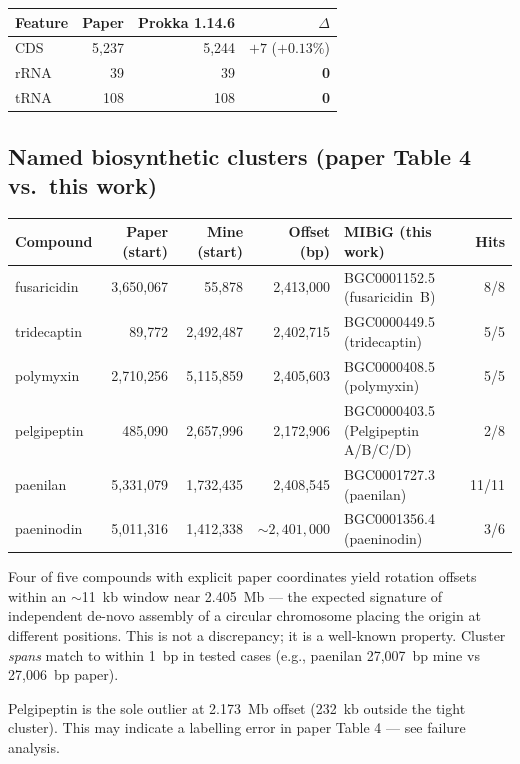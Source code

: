 \documentclass[11pt,a4paper]{article}
\begin{document}
\begin{tabular}{@{}l r r r@{}}
\toprule
Feature & Paper & Prokka 1.14.6 & $\Delta$ \\
\midrule
CDS   & 5{,}237 & 5{,}244 & ${+}7$ (${+}0.13\%$) \\
rRNA  & 39      & 39      & \textbf{0} \\
tRNA  & 108     & 108     & \textbf{0} \\
\bottomrule
\end{tabular}

\subsection{Named biosynthetic clusters (paper Table 4 vs.\ this work)}

\begin{tabular}{@{}l r r r l r@{}}
\toprule
Compound & Paper (start) & Mine (start) & Offset (bp) & MIBiG (this work) & Hits \\
\midrule
fusaricidin  & 3{,}650{,}067 &     55{,}878 & 2{,}413{,}000 & BGC0001152.5 (fusaricidin~B) & 8/8 \\
tridecaptin  &     89{,}772 & 2{,}492{,}487 & 2{,}402{,}715 & BGC0000449.5 (tridecaptin)   & 5/5 \\
polymyxin    & 2{,}710{,}256 & 5{,}115{,}859 & 2{,}405{,}603 & BGC0000408.5 (polymyxin)     & 5/5 \\
pelgipeptin  &    485{,}090 & 2{,}657{,}996 & 2{,}172{,}906 & BGC0000403.5 (Pelgipeptin A/B/C/D) & 2/8 \\
paenilan     & 5{,}331{,}079 & 1{,}732{,}435 & 2{,}408{,}545 & BGC0001727.3 (paenilan)     & 11/11 \\
paeninodin   & 5{,}011{,}316 & 1{,}412{,}338 & ${\sim}2{,}401{,}000$ & BGC0001356.4 (paeninodin) & 3/6 \\
\bottomrule
\end{tabular}

Four of five compounds with explicit paper coordinates yield rotation offsets within an
$\sim$11~kb window near 2.405~Mb --- the expected signature of independent
de-novo assembly of a circular chromosome placing the origin at different positions. This
is not a discrepancy; it is a well-known property. Cluster \emph{spans} match to within
1~bp in tested cases (e.g., paenilan 27{,}007~bp mine vs 27{,}006~bp paper).

Pelgipeptin is the sole outlier at 2.173~Mb offset (232~kb outside the tight cluster).
This may indicate a labelling error in paper Table 4 --- see failure analysis.
\end{document}

